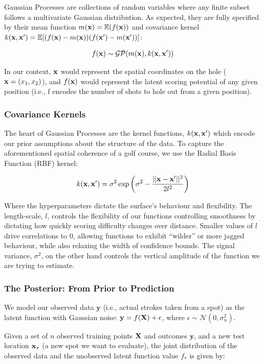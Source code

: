 \documentclass[11pt, letterpaper]{article}
\begin{document}
Gaussian Processes are collections of random variables where any finite subset follows a multivariate Gaussian distribution. As expected, they are fully specified by their mean function $m(\mathbf{x}) = \mathbb{E}(f(\mathbf{x}))$  and covariance kernel $k(\mathbf{x},\mathbf{x}') = \mathbb{E}[(f(\mathbf{x})-m(\mathbf{x}))(f(\mathbf{x}')-m(\mathbf{x}'))]$:

$$f(\mathbf{x}) \sim \mathcal{GP}(m(\mathbf{x}), k(\mathbf{x},\mathbf{x}'))$$

In our context, $\mathbf{x}$ would represent the spatial coordinates on the hole ($\mathbf{x} = (x_1, x_2)$), and $f(\mathbf{x})$ would represent the latent scoring potential of any given position (i.e., f encodes the number of shots to hole out from a given position).

\subsubsection{Covariance Kernels}
The heart of Gaussian Processes are the kernel functions, $k(\mathbf{x},\mathbf{x}')$ which encode our prior assumptions about the structure of the data. To capture the aforementioned spatial coherence of a golf course, we use the Radial Basis Function (RBF) kernel:

$$k(\mathbf{x},\mathbf{x}') = \sigma^2 \exp\left(\sigma^2-\frac{||\mathbf{x}-\mathbf{x}'||^2}{2l^2}\right)$$

Where the hyperparameters dictate the surface's behaviour and flexibility. The length-scale, $l$, controls the flexibility of our functions controlling smoothness by dictating how quickly scoring difficulty changes over distance. Smaller values of $l$ drive correlations to 0, allowing functions to exhibit ``wilder'' or more jagged behaviour, while also relaxing the width of confidence bounds. The signal variance, $\sigma^2$, on the other hand controls the vertical amplitude of the function we are trying to estimate.

\subsubsection{The Posterior: From Prior to Prediction}

We model our observed data $\mathbf{y}$ (i.e., actual strokes taken from a spot) as the latent function with Gaussian noise: $\mathbf{y} = f(\mathbf{X}) + \epsilon$, where $\epsilon \sim \mathcal{N}(0, \sigma^2_n)$. 

Given a set of $n$ observed training points $\mathbf{X}$ and outcomes $\mathbf{y}$, and a new test location $\mathbf{x}_*$ (a new spot we want to evaluate), the joint distribution of the observed data and the unobserved latent function value $f_*$ is given by:
\end{document}
